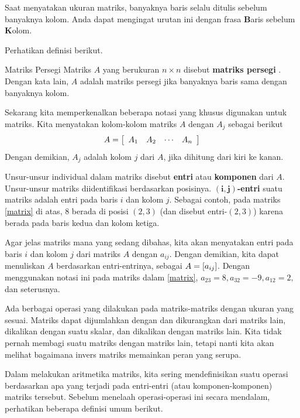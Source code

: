 Saat menyatakan ukuran matriks, banyaknya baris selalu ditulis
sebelum banyaknya kolom. Anda
dapat mengingat urutan ini dengan frasa \textbf{B}aris sebelum \textbf{K}olom. 

Perhatikan definisi berikut.

\begin{definition}{Matriks Persegi}\label{def:squarematrix}
Matriks $A$ yang berukuran $n \times n$ disebut \textbf{matriks persegi} .
Dengan kata lain, $A$ adalah matriks persegi jika banyaknya baris sama dengan
banyaknya kolom.
\end{definition}

Sekarang kita memperkenalkan beberapa notasi yang khusus digunakan untuk matriks. Kita menyatakan kolom-kolom matriks $A$
dengan $A_{j}$ sebagai berikut
\begin{equation*}
A = 
\left[
\begin{array}{rrrr}
A_{1} & A_{2} & \cdots & A_{n}
\end{array}
\right]
\end{equation*}
Dengan demikian, $A_{j}$ adalah kolom $j$ dari $A$, jika dihitung dari kiri ke kanan. 

Unsur-unsur individual dalam matriks disebut \textbf{entri}  atau \textbf{komponen}  dari $A$. Unsur-unsur matriks
diidentifikasi berdasarkan posisinya. $\mathbf{\left( i, j \right)}$\textbf{-entri} suatu matriks adalah entri
pada baris $i$ dan kolom $j$. Sebagai contoh, pada matriks \ref{matrix} di atas, $8$ berada di
posisi $\left(2,3 \right)$ (dan disebut entri-$\left(2,3 \right)$) karena berada pada baris kedua dan kolom ketiga. 

Agar jelas matriks mana yang sedang dibahas, kita
akan menyatakan entri pada baris $i$ dan kolom $j$ dari matriks $A$ dengan $a_{ij}$. Dengan demikian, kita dapat menuliskan $A$ berdasarkan entri-entrinya,
sebagai $A= \left[ a_{ij} \right]$. Dengan menggunakan notasi ini pada matriks dalam \ref{matrix},
$a_{23}=8, a_{32}=-9, a_{12}=2,$ dan seterusnya.

Ada berbagai operasi yang dilakukan pada matriks-matriks dengan ukuran yang sesuai.
Matriks dapat dijumlahkan dengan dan dikurangkan dari matriks lain,
dikalikan dengan suatu skalar, dan dikalikan dengan matriks lain. Kita
tidak pernah membagi suatu matriks dengan matriks lain, tetapi nanti kita akan melihat bagaimana invers matriks memainkan peran yang serupa. 

Dalam melakukan aritmetika matriks, kita sering mendefinisikan suatu operasi berdasarkan apa yang
terjadi pada entri-entri (atau komponen-komponen)
matriks tersebut. Sebelum menelaah operasi-operasi ini secara mendalam, perhatikan beberapa
definisi umum berikut.

